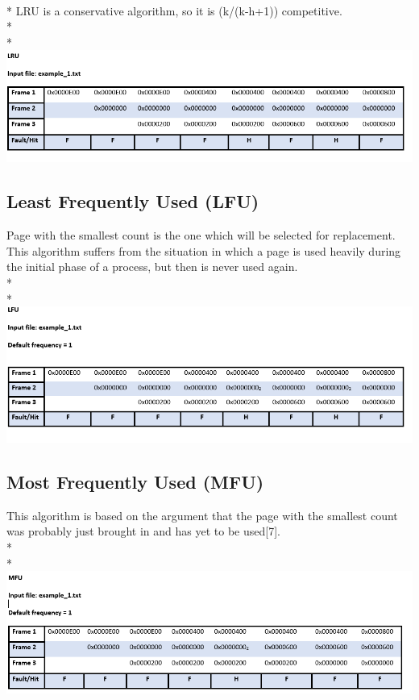 \documentclass[12pt, oneside, a4paper]{report}
\begin{document}
\\*
LRU is a conservative algorithm, so it is (k/(k-h+1)) competitive.
\\*
\\*
\includegraphics[scale=0.6]{lru}
\newpage

\subsection*{Least Frequently Used (LFU)}
Page with the smallest count is the one which will be selected for replacement. This algorithm suffers from the situation in which a page is used heavily during the initial phase of a process, but then is never used again.
\\*
\\*
\includegraphics[scale=0.6]{lfu}
\newpage

\subsection*{Most Frequently Used (MFU)}
This algorithm is based on the argument that the page with the smallest count was probably just brought in and has yet to be used[7].
\\*
\\*
\includegraphics[scale=0.6]{mfu}
\newpage
\end{document}
